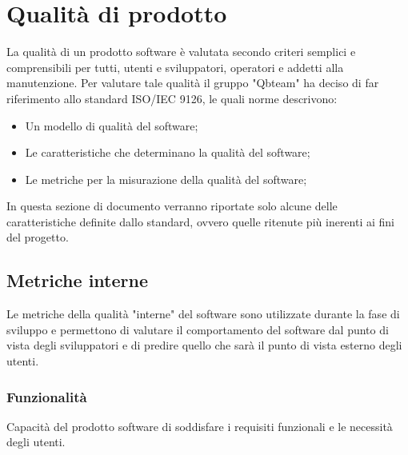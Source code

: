 
\section{Qualità di prodotto}
La qualità di un prodotto software è valutata secondo criteri semplici e comprensibili per tutti, utenti e sviluppatori, operatori e addetti alla manutenzione.
Per valutare tale qualità il gruppo "Qbteam" ha deciso di far riferimento allo standard ISO/IEC 9126, le quali norme descrivono:

\begin{itemize}
\item Un modello di qualità del software;
\item Le caratteristiche che determinano la qualità del software;
\item Le metriche per la misurazione della qualità del software;
\end{itemize}

In questa sezione di documento verranno riportate solo alcune delle caratteristiche definite dallo standard, ovvero quelle ritenute più inerenti ai fini del progetto.

\subsection{Metriche interne}
 Le metriche della qualità "interne" del software sono utilizzate durante la fase di sviluppo e permettono di valutare il comportamento del software dal punto di vista degli sviluppatori e di predire quello che sarà il punto di vista esterno degli utenti.
  \subsubsection{Funzionalità}
      Capacità del prodotto software di soddisfare i requisiti funzionali e le necessità degli utenti.\\

